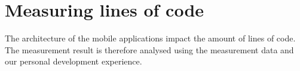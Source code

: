 \section{Measuring lines of code}
The architecture of the mobile applications impact the amount of lines of code. The measurement result is therefore analysed using the measurement data and our personal development experience.